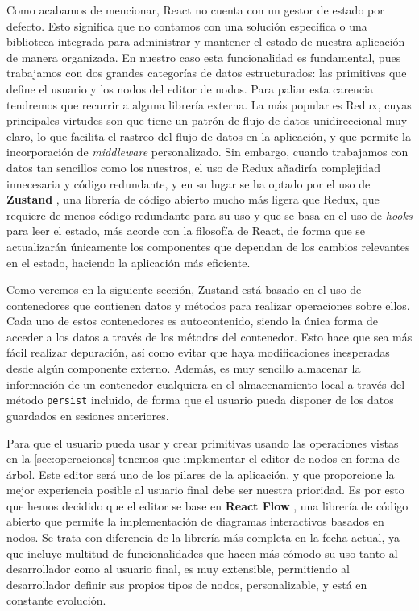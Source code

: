 Como acabamos de mencionar, React no cuenta con un gestor de estado por defecto. Esto significa que no contamos con una solución específica o una biblioteca integrada para administrar y mantener el estado de nuestra aplicación de manera organizada. En nuestro caso esta funcionalidad es fundamental, pues trabajamos con dos grandes categorías de datos estructurados: las primitivas que define el usuario y los nodos del editor de nodos. Para paliar esta carencia tendremos que recurrir a alguna librería externa. La más popular es Redux, cuyas principales virtudes son que tiene un patrón de flujo de datos unidireccional muy claro, lo que facilita el rastreo del flujo de datos en la aplicación, y que permite la incorporación de \textit{middleware} personalizado. Sin embargo, cuando trabajamos con datos tan sencillos como los nuestros, el uso de Redux añadiría complejidad innecesaria y código redundante, y en su lugar se ha optado por el uso de \textbf{Zustand} \cite{zustand}, una librería de código abierto mucho más ligera que Redux, que requiere de menos código redundante para su uso y que se basa en el uso de \textit{hooks} para leer el estado, más acorde con la filosofía de React, de forma que se actualizarán únicamente los componentes que dependan de los cambios relevantes en el estado, haciendo la aplicación más eficiente.\newline 

Como veremos en la siguiente sección, Zustand está basado en el uso de contenedores que contienen datos y métodos para realizar operaciones sobre ellos. Cada uno de estos contenedores es autocontenido, siendo la única forma de acceder a los datos a través de los métodos del contenedor. Esto hace que sea más fácil realizar depuración, así como evitar que haya modificaciones inesperadas desde algún componente externo. Además, es muy sencillo almacenar la información de un contenedor cualquiera en el almacenamiento local a través del método \texttt{persist} incluido, de forma que el usuario pueda disponer de los datos guardados en sesiones anteriores.\newline

Para que el usuario pueda usar y crear primitivas usando las operaciones vistas en la \autoref{sec:operaciones} tenemos que implementar el editor de nodos en forma de árbol. Este editor será uno de los pilares de la aplicación, y que proporcione la mejor experiencia posible al usuario final debe ser nuestra prioridad. Es por esto que hemos decidido que el editor se base en \textbf{React Flow} \cite{react-flow}, una librería de código abierto que permite la implementación de diagramas interactivos basados en nodos. Se trata con diferencia de la librería más completa en la fecha actual, ya que incluye multitud de funcionalidades que hacen más cómodo su uso tanto al desarrollador como al usuario final, es muy extensible, permitiendo al desarrollador definir sus propios tipos de nodos, personalizable, y está en constante evolución.\newline

